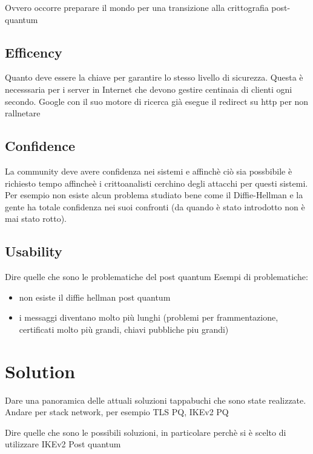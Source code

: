 Ovvero occorre preparare il mondo per una transizione alla crittografia post-quantum

\subsection{Efficency}

Quanto deve essere la chiave per garantire lo stesso livello di sicurezza. Questa è necesssaria per i server in Internet che devono gestire centinaia di clienti ogni secondo.
Google con il suo motore di ricerca già esegue il redirect su http per non rallnetare

\subsection{Confidence}

La community deve avere confidenza nei sistemi e affinchè ciò sia possbibile è richiesto tempo affincheè i crittoanalisti cerchino degli attacchi per questi sistemi. 
Per esempio non esiste alcun problema studiato bene come il  Diffie-Hellman e la gente ha totale confidenza nei suoi confronti (da quando è stato introdotto non è mai stato rotto).


\subsection{Usability}



Dire quelle che sono le problematiche del post quantum
Esempi di problematiche:
\begin{itemize}
\item non esiste il diffie hellman post quantum
\item i messaggi diventano molto più lunghi (problemi per frammentazione,
	certificati molto più grandi, chiavi pubbliche piu grandi)
\end{itemize}


\section{Solution}

Dare una panoramica delle attuali soluzioni tappabuchi che sono state
realizzate. Andare per stack network, per esempio TLS PQ, IKEv2 PQ

Dire quelle che sono le possibili soluzioni, in particolare perchè si è scelto
di utilizzare IKEv2 Post quantum

